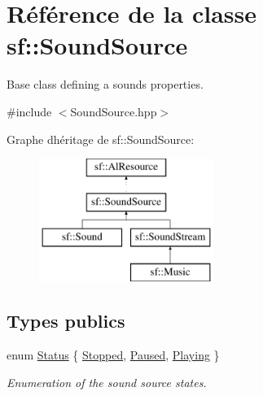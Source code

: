 \hypertarget{classsf_1_1SoundSource}{}\section{Référence de la classe sf\+:\+:Sound\+Source}
\label{classsf_1_1SoundSource}


Base class defining a sound\textquotesingle{}s properties.  




{\ttfamily \#include $<$Sound\+Source.\+hpp$>$}

Graphe d\textquotesingle{}héritage de sf\+:\+:Sound\+Source\+:\begin{figure}[H]
\begin{center}
\leavevmode
\includegraphics[height=4.000000cm]{classsf_1_1SoundSource}
\end{center}
\end{figure}
\subsection*{Types publics}
\begin{DoxyCompactItemize}
\item 
enum \hyperlink{classsf_1_1SoundSource_ac43af72c98c077500b239bc75b812f03}{Status} \{ \hyperlink{classsf_1_1SoundSource_ac43af72c98c077500b239bc75b812f03adabb01e8aa85b2f54b344890addf764a}{Stopped}, 
\hyperlink{classsf_1_1SoundSource_ac43af72c98c077500b239bc75b812f03ac3ca1fcc0394267c9bdbe3dc0a8a7e41}{Paused}, 
\hyperlink{classsf_1_1SoundSource_ac43af72c98c077500b239bc75b812f03af07bdea9f70ef7606dfc9f955beeee18}{Playing}
 \}\begin{DoxyCompactList}\small\item\em Enumeration of the sound source states. \end{DoxyCompactList}
\end{DoxyCompactItemize}
